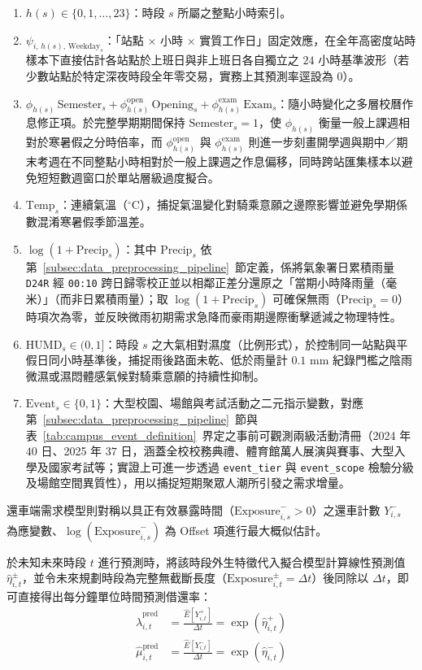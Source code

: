 \begin{enumerate}[label = \textbullet]
    \item $h(s) \in \{0, 1, \dots, 23\}$：時段 $s$ 所屬之整點小時索引。
    \item $\psi_{i,\, h(s),\, \text{Weekday}_s}$：「站點 $\times$ 小時 $\times$ 實質工作日」固定效應，在全年高密度站時樣本下直接估計各站點於上班日與非上班日各自獨立之 $24$ 小時基準波形（若少數站點於特定深夜時段全年零交易，實務上其預測率逕設為 $0$）。
    \item $\phi_{h(s)} \, \text{Semester}_s + \phi^{\text{open}}_{h(s)} \, \text{Opening}_s + \phi^{\text{exam}}_{h(s)} \, \text{Exam}_s$：隨小時變化之多層校曆作息修正項。於完整學期期間保持 $\text{Semester}_s = 1$，使 $\phi_{h(s)}$ 衡量一般上課週相對於寒暑假之分時倍率，而 $\phi^{\text{open}}_{h(s)}$ 與 $\phi^{\text{exam}}_{h(s)}$ 則進一步刻畫開學週與期中／期末考週在不同整點小時相對於一般上課週之作息偏移，同時跨站匯集樣本以避免短短數週窗口於單站層級過度擬合。
    \item $\text{Temp}_s$：連續氣溫（${}^\circ\text{C}$），捕捉氣溫變化對騎乘意願之邊際影響並避免學期係數混淆寒暑假季節溫差。
    \item $\log(1 + \text{Precip}_s)$：其中 $\text{Precip}_s$ 依第~\ref{subsec:data_preprocessing_pipeline}~節定義，係將氣象署日累積雨量 \texttt{D24R} 經 \texttt{00:10} 跨日歸零校正並以相鄰正差分還原之「當期小時降雨量（毫米）」（而非日累積雨量）；取 $\log(1 + \text{Precip}_s)$ 可確保無雨（$\text{Precip}_s = 0$）時項次為零，並反映微雨初期需求急降而豪雨期邊際衝擊遞減之物理特性。
    \item $\text{HUMD}_s \in (0, 1]$：時段 $s$ 之大氣相對濕度（比例形式），於控制同一站點與平假日同小時基準後，捕捉雨後路面未乾、低於雨量計 $0.1\text{ mm}$ 紀錄門檻之陰雨微濕或濕悶體感氣候對騎乘意願的持續性抑制。
    \item $\text{Event}_s \in \{0, 1\}$：大型校園、場館與考試活動之二元指示變數，對應第~\ref{subsec:data_preprocessing_pipeline}~節與表~\ref{tab:campus_event_definition}~界定之事前可觀測兩級活動清冊（2024 年 $40$ 日、2025 年 $37$ 日，涵蓋全校校務典禮、體育館萬人展演與賽事、大型入學及國家考試等；實證上可進一步透過 \texttt{event\_tier} 與 \texttt{event\_scope} 檢驗分級及場館空間異質性），用以捕捉短期聚眾人潮所引發之需求增量。
\end{enumerate}
還車端需求模型則對稱以具正有效暴露時間（$\text{Exposure}^-_{i,s} > 0$）之還車計數 $Y^-_{i,s}$ 為應變數、$\log(\text{Exposure}^-_{i,s})$ 為 Offset 項進行最大概似估計。

於未知未來時段 $t$ 進行預測時，將該時段外生特徵代入擬合模型計算線性預測值 $\hat{\eta}^{\pm}_{i,t}$，並令未來規劃時段為完整無截斷長度（$\text{Exposure}^{\pm}_{i,t} = \Delta t$）後同除以 $\Delta t$，即可直接得出每分鐘單位時間預測借還率：
\begin{align}
\hat{\lambda}^{\text{pred}}_{i,t} &= \frac{\hat{E}\!\left[Y^+_{i,t}\right]}{\Delta t} = \exp\!\left(\hat{\eta}^+_{i,t}\right) \\
\hat{\mu}^{\text{pred}}_{i,t} &= \frac{\hat{E}\!\left[Y^-_{i,t}\right]}{\Delta t} = \exp\!\left(\hat{\eta}^-_{i,t}\right)
\end{align}

